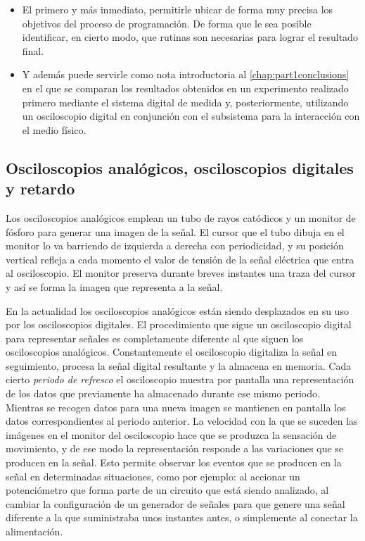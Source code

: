 \begin{itemize}
	\item El primero y más inmediato, permitirle ubicar de forma muy
		precisa los objetivos del proceso de programación. De forma
		que le sea posible identificar, en cierto modo, que rutinas
		son necesarias para lograr el resultado final.
	\item Y además puede servirle como nota introductoria al
		\cref{chap:part1conclusions} en el que se comparan los
		resultados obtenidos en un experimento realizado primero
		mediante el sistema digital de medida y, posteriormente,
		utilizando un osciloscopio digital en conjunción con el
		subsistema para la interacción con el medio físico.
\end{itemize}


\subsection{Osciloscopios analógicos, osciloscopios digitales y retardo}

Los osciloscopios analógicos emplean un tubo de rayos catódicos y un
monitor de fósforo para generar una imagen de la señal. El cursor que el
tubo dibuja en el monitor lo va barriendo de izquierda a derecha con
periodicidad, y su posición vertical refleja a cada momento el valor de
tensión de la señal eléctrica que entra al osciloscopio. El monitor
preserva durante breves instantes una traza del cursor y así se forma la
imagen que representa a la señal.

En la actualidad los osciloscopios analógicos están siendo desplazados en
su uso por los osciloscopios digitales. El procedimiento que sigue un
osciloscopio digital para representar señales es completamente diferente al
que siguen los osciloscopios analógicos. Constantemente el osciloscopio
digitaliza la señal en seguimiento, procesa la señal digital resultante y
la almacena en memoria. Cada cierto \emph{periodo de refresco} el
osciloscopio muestra por pantalla una representación de los datos que
previamente ha almacenado durante ese mismo periodo. Mientras se recogen
datos para una nueva imagen se mantienen en pantalla los datos
correspondientes al periodo anterior. La velocidad con la que se suceden
las imágenes en el monitor del osciloscopio hace que se produzca la
sensación de movimiento, y de ese modo la representación responde a las
variaciones que se producen en la señal. Esto permite observar los eventos
que se producen en la señal en determinadas situaciones, como por ejemplo:
al accionar un potenciómetro que forma parte de un circuito que está siendo
analizado, al cambiar la configuración de un generador de señales para que
genere una señal diferente a la que suministraba unos instantes antes, o
simplemente al conectar la alimentación.

